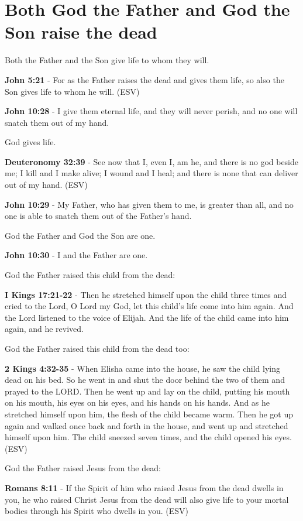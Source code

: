 \documentclass[11pt]{article}
\begin{document}
\section{Both God the Father and God the Son raise the dead}
\label{sec:org551dcc4}
Both the Father and the Son give life to whom they will.

\textbf{John 5:21} - For as the Father raises the dead and gives them life, so also the Son gives life to whom he will. (ESV)

\textbf{John 10:28} - I give them eternal life, and they will never perish, and no one will snatch them out of my hand.

God gives life.

\textbf{Deuteronomy 32:39} - See now that I, even I, am he, and there is no god beside me; I kill and I make alive; I wound and I heal; and there is none that can deliver out of my hand. (ESV)

\textbf{John 10:29} - My Father, who has given them to me, is greater than all, and no one is able to snatch them out of the Father's hand.

God the Father and God the Son are one.

\textbf{John 10:30} - I and the Father are one.

God the Father raised this child from the dead:

\textbf{I Kings 17:21-22} - Then he stretched himself upon the child three times and cried to the Lord, O Lord my God, let this child's life come into him again. And the Lord listened to the voice of Elijah. And the life of the child came into him again, and he revived.

God the Father raised this child from the dead too:

\textbf{2 Kings 4:32-35} -  When Elisha came into the house, he saw the child lying dead on his bed.  So he went in and shut the door behind the two of them and prayed to the LORD.  Then he went up and lay on the child, putting his mouth on his mouth, his eyes on his eyes, and his hands on his hands.  And as he stretched himself upon him, the flesh of the child became warm.  Then he got up again and walked once back and forth in the house, and went up and stretched himself upon him. The child sneezed seven times, and the child opened his eyes.  (ESV)

God the Father raised Jesus from the dead:

\textbf{Romans 8:11} - If the Spirit of him who raised Jesus from the dead dwells in you, he who raised Christ Jesus from the dead will also give life to your mortal bodies through his Spirit who dwells in you. (ESV)
\end{document}
